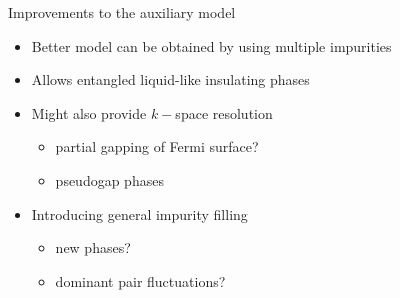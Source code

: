 \documentclass[11pt,aspectratio=169]{beamer}
\begin{document}
\begin{frame}{Improvements to the auxiliary model}
\begin{itemize}
	\item Better model can be obtained by using multiple impurities\\[20pt]
	\item Allows entangled liquid-like insulating phases\\[20pt]
	\item Might also provide \(k-\)space resolution 
	\begin{itemize}
		\item partial gapping of Fermi surface?
		\item pseudogap phases\\[20pt]
	\end{itemize}
	\item Introducing general impurity filling
	\begin{itemize}
		\item new phases?
		\item dominant pair fluctuations?
	\end{itemize}
\end{itemize}
\end{frame}
\end{document}
